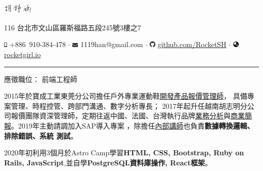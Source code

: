 \documentclass[a4paper,10pt]{article}
\begin{document}
\pagestyle{empty} %
\frenchspacing

\begin{center} 
  \Huge{\includegraphics[height=1.3em,trim=0 10mm 0 -1cm]{shared/signature.png}}\par
  \normalsize {116 台北市文山區羅斯福路五段245號3樓之7}

  \includegraphics[height=0.7em]{shared/mobile-alt.eps} +886~910-384-478 $\cdot$
  \includegraphics[width=0.8em]{shared/envelope.eps} 1119han@gmail.com $\cdot$
  \includegraphics[width=0.8em]{shared/github.eps}
  \href{https://github.com/RocketSH}{github.com/RocketSH} $\cdot$
  \includegraphics[width=0.8em]{shared/globe-asia.eps} \href{https://rocketgirl.io/}{rocketgirl.io}
\end{center}

\rule{15.2cm}{0.05em}

\vspace*{1em}
\begin{center}
  \large{應徵職位： 前端工程師}
\end{center}
\vspace*{1em}

\begin{center}
  \begin{minipage}{0.9\textwidth}
        2015年於寶成工業東莞分公司擔任戶外專業運動鞋\underline{開發產品報價管理師}，
        具備專案管理、時程控管、跨部門溝通、數字分析專長；
        2017年起升任越南胡志明分公司報價團隊資深管理師，定期往返中國、法國、台灣執行品牌\underline{業務分析}與\underline{商業簡報}。2019年主動請調加入SAP導入專案
        ，除擔任\underline{內部講師}也負責\textbf{數據轉換邏輯、排除錯誤、系統
          測試}。

        \vspace*{1em}
        2020年初利用3個月於Astro Camp學習\textbf{HTML, CSS, Bootstrap, Ruby on
          Rails, JavaScript},並自學\textbf{PostgreSQL資料庫操作, React框架}。
  \end{minipage}
\end{center}
\end{document}
